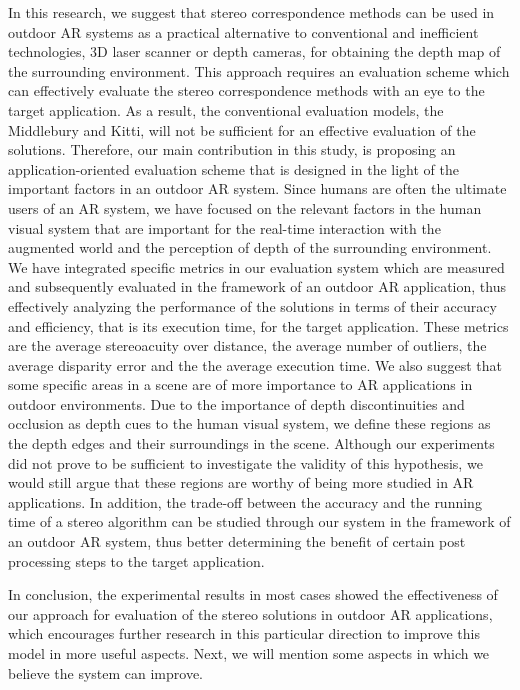 In this research, we suggest that stereo correspondence methods can be used in outdoor AR systems
as a practical alternative to conventional and inefficient technologies, 3D laser scanner or depth cameras, for obtaining the depth map of the surrounding environment.
This approach requires an evaluation scheme which can effectively evaluate the stereo correspondence methods with an eye to the target application. As a result, the conventional
evaluation models, the Middlebury and Kitti, will not be sufficient for an effective evaluation of the solutions.
Therefore, our main contribution in this study, is proposing an application-oriented evaluation scheme that is designed in the light of the important
factors in an outdoor AR system. Since humans are often the ultimate users of an AR system, we have focused on the relevant factors in the human visual system
that are important for the real-time interaction with the augmented world and the perception of depth of the surrounding environment. We have integrated
specific metrics in our evaluation system which are measured and subsequently evaluated in the framework of an outdoor AR application, thus effectively
analyzing the performance of the solutions in terms of their accuracy and efficiency, that is its execution time, for the target application. These metrics are
the average stereoacuity over distance, the average number of outliers, the average disparity error and the the average execution time. We also suggest that some specific areas 
in a scene are of more importance to AR applications in outdoor environments. Due to the importance of depth discontinuities and occlusion as depth cues to the human visual system,
we define these regions as the depth edges and their surroundings in the scene. Although our experiments did not prove to be sufficient to investigate the validity of this hypothesis,
we would still argue that these regions are worthy of being more studied in AR applications.
In addition, the trade-off between the accuracy and the running time of a stereo algorithm can be studied through our system in the framework of an outdoor AR system, thus
better determining the benefit of certain post processing steps to the target application.

In conclusion, the experimental results in most cases showed the effectiveness of our approach for evaluation of the stereo solutions in outdoor AR applications, which encourages
further research in this particular direction to improve this model in more useful aspects.
Next, we will mention some aspects in which we believe the system can improve.

